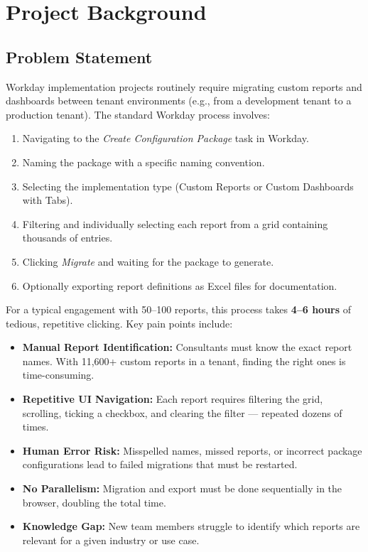 \documentclass[12pt,a4paper]{article}
\begin{document}
\section{Project Background}
\label{sec:project-background}

\subsection{Problem Statement}
\label{subsec:problem-statement}

Workday implementation projects routinely require migrating custom reports and dashboards between tenant environments (e.g., from a development tenant to a production tenant). The standard Workday process involves:

\begin{enumerate}[leftmargin=2em]
  \item Navigating to the \textit{Create Configuration Package} task in Workday.
  \item Naming the package with a specific naming convention.
  \item Selecting the implementation type (Custom Reports or Custom Dashboards with Tabs).
  \item Filtering and individually selecting each report from a grid containing thousands of entries.
  \item Clicking \textit{Migrate} and waiting for the package to generate.
  \item Optionally exporting report definitions as Excel files for documentation.
\end{enumerate}

For a typical engagement with 50--100 reports, this process takes \textbf{4--6 hours} of tedious, repetitive clicking. Key pain points include:

\begin{itemize}[leftmargin=2em]
  \item \textbf{Manual Report Identification:} Consultants must know the exact report names. With 11,600+ custom reports in a tenant, finding the right ones is time-consuming.
  \item \textbf{Repetitive UI Navigation:} Each report requires filtering the grid, scrolling, ticking a checkbox, and clearing the filter --- repeated dozens of times.
  \item \textbf{Human Error Risk:} Misspelled names, missed reports, or incorrect package configurations lead to failed migrations that must be restarted.
  \item \textbf{No Parallelism:} Migration and export must be done sequentially in the browser, doubling the total time.
  \item \textbf{Knowledge Gap:} New team members struggle to identify which reports are relevant for a given industry or use case.
\end{itemize}
\end{document}
